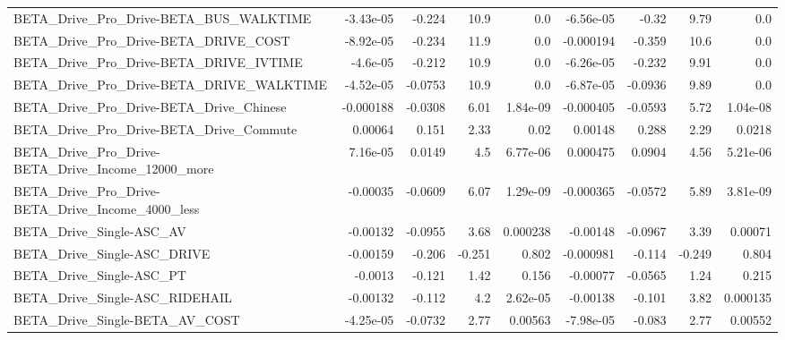 \begin{tabular}{lrrrrrrrr}
BETA\_Drive\_Pro\_Drive-BETA\_BUS\_WALKTIME             &   -3.43e-05 &       -0.224 &      10.9 &      0.0 &  -6.56e-05 &       -0.32 &         9.79 &           0.0 \\
BETA\_Drive\_Pro\_Drive-BETA\_DRIVE\_COST               &   -8.92e-05 &       -0.234 &      11.9 &      0.0 &  -0.000194 &      -0.359 &         10.6 &           0.0 \\
BETA\_Drive\_Pro\_Drive-BETA\_DRIVE\_IVTIME             &    -4.6e-05 &       -0.212 &      10.9 &      0.0 &  -6.26e-05 &      -0.232 &         9.91 &           0.0 \\
BETA\_Drive\_Pro\_Drive-BETA\_DRIVE\_WALKTIME           &   -4.52e-05 &      -0.0753 &      10.9 &      0.0 &  -6.87e-05 &     -0.0936 &         9.89 &           0.0 \\
BETA\_Drive\_Pro\_Drive-BETA\_Drive\_Chinese            &   -0.000188 &      -0.0308 &      6.01 & 1.84e-09 &  -0.000405 &     -0.0593 &         5.72 &      1.04e-08 \\
BETA\_Drive\_Pro\_Drive-BETA\_Drive\_Commute            &     0.00064 &        0.151 &      2.33 &     0.02 &    0.00148 &       0.288 &         2.29 &        0.0218 \\
BETA\_Drive\_Pro\_Drive-BETA\_Drive\_Income\_12000\_more  &    7.16e-05 &       0.0149 &       4.5 & 6.77e-06 &   0.000475 &      0.0904 &         4.56 &      5.21e-06 \\
BETA\_Drive\_Pro\_Drive-BETA\_Drive\_Income\_4000\_less   &    -0.00035 &      -0.0609 &      6.07 & 1.29e-09 &  -0.000365 &     -0.0572 &         5.89 &      3.81e-09 \\
BETA\_Drive\_Single-ASC\_AV                           &    -0.00132 &      -0.0955 &      3.68 & 0.000238 &   -0.00148 &     -0.0967 &         3.39 &       0.00071 \\
BETA\_Drive\_Single-ASC\_DRIVE                        &    -0.00159 &       -0.206 &    -0.251 &    0.802 &  -0.000981 &      -0.114 &       -0.249 &         0.804 \\
BETA\_Drive\_Single-ASC\_PT                           &     -0.0013 &       -0.121 &      1.42 &    0.156 &   -0.00077 &     -0.0565 &         1.24 &         0.215 \\
BETA\_Drive\_Single-ASC\_RIDEHAIL                     &    -0.00132 &       -0.112 &       4.2 & 2.62e-05 &   -0.00138 &      -0.101 &         3.82 &      0.000135 \\
BETA\_Drive\_Single-BETA\_AV\_COST                     &   -4.25e-05 &      -0.0732 &      2.77 &  0.00563 &  -7.98e-05 &      -0.083 &         2.77 &       0.00552 \\

\end{tabular}
